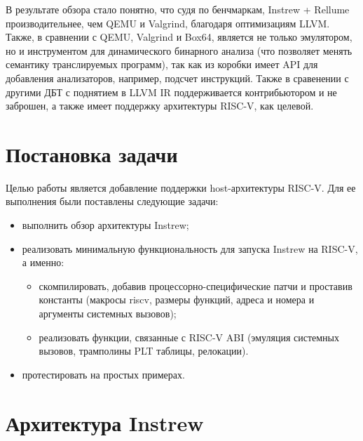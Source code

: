 В результате обзора стало понятно, что судя по бенчмаркам, Instrew + Rellume производительнее, чем QEMU и Valgrind, благодаря оптимизациям LLVM. Также, в сравнении с QEMU, Valgrind и Box64, является не только эмулятором, но и инструментом для динамического бинарного анализа (что позволяет менять семантику транслируемых программ), так как из коробки имеет API для добавления анализаторов, например, подсчет инструкций.
Также в сравенении с другими ДБТ с поднятием в LLVM IR поддерживается контрибьютором и не заброшен, а также имеет поддержку архитектуры RISC-V, как целевой.
\section{Постановка задачи}
Целью работы является добавление поддержки host-архитектуры RISC-V. Для ее выполнения были поставлены следующие задачи:
\begin{itemize}
    \item выполнить обзор архитектуры Instrew;
    \item реализовать минимальную функциональность для запуска Instrew на RISC-V, а именно:
          \begin{itemize}
              \item скомпилировать, добавив процессорно-специфические патчи и проставив константы (макросы riscv, размеры функций, адреса и номера и аргументы системных вызовов);
              \item реализовать функции, связанные с RISC-V ABI (эмуляция системных вызовов, трамполины PLT таблицы, релокации).
          \end{itemize}
    \item протестировать на простых примерах.
\end{itemize}

\section{Архитектура Instrew}


